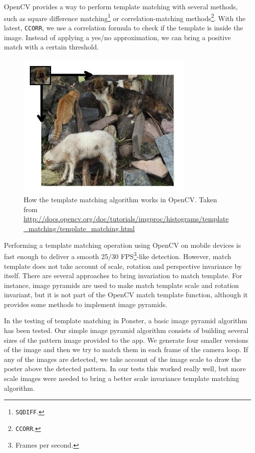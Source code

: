 OpenCV provides a way to perform template matching with several methods, such as
square difference matching\footnote{\texttt{SQDIFF}.} or correlation-matching
methods\footnote{\texttt{CCORR}.}. With the latest, \texttt{CCORR}, we use a 
correlation formula to check if the template is inside the image. Instead of
applying a yes/no approximation, we can bring a positive match with a certain
threshold. 

\begin{figure}
\centering
\includegraphics[scale=0.55]{img/templatematch.png}
\caption{\label{fig:templatematch}How the template matching algorithm works in
  OpenCV. Taken from
  \url{http://docs.opencv.org/doc/tutorials/imgproc/histograms/template_matching/template_matching.html}} 
\end{figure} 

Performing a template matching operation using OpenCV on mobile devices is fast
enough to deliver a smooth 25/30 FPS\footnote{Frames per second.}-like
detection. However, match template does not 
take account of scale, rotation and perspective invariance by itself. There are
several approaches to bring invariation to match template. For instance, image
pyramids are used to make match template scale and rotation
invariant\cite{4368176}, but it is not part of the OpenCV match template function, although it
provides some methods to implement image pyramids\cite{ocv02}. 

In the testing of template matching in Ponster, a basic image pyramid algorithm
has been tested. Our simple image pyramid algorithm consists of building
several sizes of the pattern image provided to the app. We generate four
smaller versions of the image and then we try to match them in each frame of
the camera loop. If any of the images are detected, we take account of the
image scale to draw the poster above the detected pattern. In our tests this
worked really well, but more scale images were needed to bring a better scale
invariance template matching algorithm.

